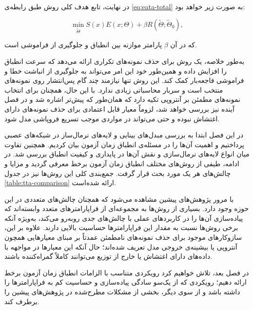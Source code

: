 در نهایت، تابع هدف کلی روش  طبق رابطه‌ی \ref{eq:eata-total} به صورت زیر خواهد بود\cite{eata}:  

\begin{equation}
	\min_{\tilde{\Theta}} S(x) E(x; \Theta) + \beta R(\tilde{\Theta}; \tilde{\Theta}_0),
	\label{eq:eata-total}
\end{equation}

که در آن \(\beta\) پارامتر موازنه بین انطباق و جلوگیری از فراموشی است.  

به‌طور خلاصه،  یک روش برای حذف نمونه‌های تکراری ارائه می‌دهد که سرعت انطباق را افزایش داده و همین‌طور خود این امر می‌تواند به جلوگیری از انباشت خطا و فراموشی فاجعه‌بار کمک کند. این روش تنها نیازمند چند گام پس‌انتشار روی نمونه‌های منتخب است و سربار محاسباتی زیادی ندارد. با این حال، همچنان برای انتخاب نمونه‌های مطمئن بر آنتروپی تکیه دارد که همان‌طور که پیش‌تر اشاره شد و در فصل آینده نیز بررسی خواهد شد، لزوماً معیار قابل اعتمادی برای حذف نمونه‌های دارای اغتشاش نبوده و حتی می‌تواند در مواردی موجب تسریع فروپاشی مدل شود.  

\newpage


در این فصل ابتدا به بررسی مبدل‌های بینایی و لایه‌های نرمال‌ساز در شبکه‌های عصبی پرداختیم و اهمیت آن‌ها را در مسئله‌ی انطباق زمان آزمون بیان کردیم. همچنین تفاوت میان انواع لایه‌های نرمال‌سازی و نقش آن‌ها در پایداری و کیفیت انطباق بررسی شد. در ادامه، طیفی از روش‌های مختلف انطباق زمان آزمون برخط معرفی گردید و مزایا و چالش‌های هر یک مورد بحث قرار گرفت. جمع‌بندی کلی این روش‌ها نیز در جدول \ref{table:tta-comparison} ارائه شده‌است.

با مرور پژوهش‌های پیشین مشاهده می‌شود که همچنان چالش‌های متعددی در این حوزه وجود دارد. بسیاری از روش‌ها به مجموعه‌ای از فراپارامترهای متعدد وابسته‌اند که پیاده‌سازی آن‌ها را در کاربردهای عملی با چالش‌های جدی روبه‌رو می‌کند، به‌ویژه آنکه برخی روش‌ها نسبت به مقدار این فراپارامترها حساسیت بالایی دارند. علاوه بر این، سازوکار‌های موجود برای حذف نمونه‌های نامطمئن عمدتاً بر مبنای معیارهایی همچون آنتروپی یا بیشینه‌ی خروجی مدل تعریف شده‌اند؛ حال آنکه این معیارها در مواجهه با داده‌های دارای اغتشاش یا خارج از توزیع می‌توانند کاملاً گمراه‌کننده باشند.  

در فصل بعد، تلاش خواهیم کرد رویکردی متناسب با الزامات انطباق زمان آزمون برخط ارائه دهیم؛ رویکردی که از یک‌سو سادگی پیاده‌سازی و حساسیت کم به فراپارامترها را داشته باشد و از سوی دیگر، بخشی از مشکلات مطرح‌شده در پژوهش‌های پیشین را برطرف کند.

